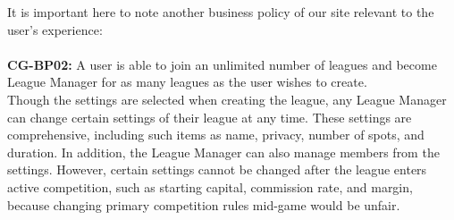 It is important here to note another business policy of our site relevant to the user's
experience: \\ \\

\textbf{CG-BP02:} A user is able to join an unlimited number of leagues and become
League Manager for as many leagues as the user wishes to create. \\

Though the settings are selected when creating the league, any League Manager can change
certain settings of their league at any time. These settings are comprehensive, including
such items as name, privacy, number of spots, and duration. In addition, the League Manager
can also manage members from the settings. However, certain settings cannot be
changed after the league enters active competition, such as starting capital, commission
rate, and margin, because changing primary competition rules mid-game would be unfair.\\

